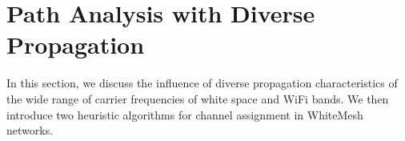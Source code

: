 \section{Path Analysis with Diverse Propagation}
\label{sec:wmalgorithms}


In this section, we discuss the influence of diverse propagation
characteristics of the wide range of carrier frequencies of
white space and WiFi bands. We then introduce two heuristic
algorithms for channel assignment in WhiteMesh networks.





